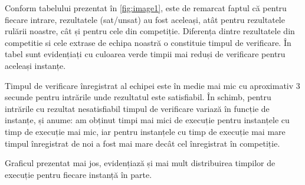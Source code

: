 Conform tabelului prezentat în \ref{fig:image1}, este de remarcat faptul că pentru fiecare intrare, rezultatele (sat/unsat) au fost aceleași, atât pentru rezultatele rulării noastre, cât și pentru cele din competiție. Diferența dintre rezultatele din competitie si cele extrase de echipa noastră o constituie timpul de verificare.
În tabel sunt evidențiați cu culoarea verde timpii mai reduși de verificare pentru aceleași instanțe.

Timpul de verificare înregistrat al echipei este în medie mai mic cu aproximativ 3 secunde pentru intrările unde rezultatul este satisfiabil. În schimb, pentru intrările cu rezultat nesatisfiabil timpul de verificare variază în funcție de instanțe, și anume: am obținut timpi mai mici de execuție pentru instanțele cu timp de execuție mai mic, iar pentru instanțele cu timp de execuție mai mare timpul înregistrat de noi a fost mai mare decât cel înregistrat în competiție. 

Graficul prezentat mai jos, evidențiază și mai mult distribuirea timpilor de execuție pentru fiecare instanță în parte.